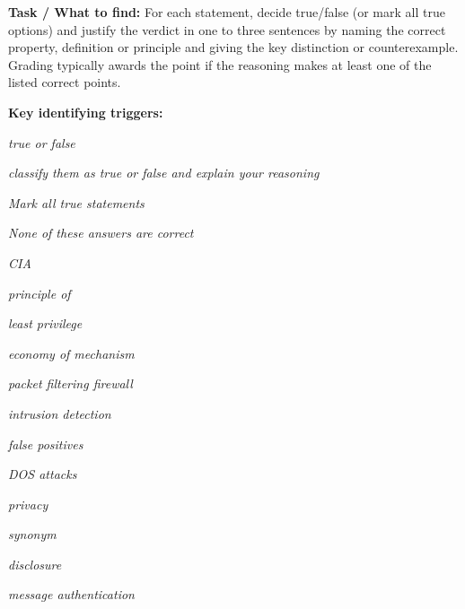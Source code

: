 \documentclass[12pt, a4paper]{article}
\begin{document}
\textbf{Task / What to find:}
For each statement, decide true/false (or mark all true options) and justify the verdict in one to three sentences by naming the correct property, definition or principle and giving the key distinction or counterexample.
Grading typically awards the point if the reasoning makes at least one of the listed correct points.

\textbf{Key identifying triggers:}
\begin{tightitem}
        \item \textit{true or false}
        \item \textit{classify them as true or false and explain your reasoning}
        \item \textit{Mark all true statements}
        \item \textit{None of these answers are correct}
        \item \textit{CIA}
        \item \textit{principle of}
        \item \textit{least privilege}
        \item \textit{economy of mechanism}
        \item \textit{packet filtering firewall}
        \item \textit{intrusion detection}
        \item \textit{false positives}
        \item \textit{DOS attacks}
        \item \textit{privacy}
        \item \textit{synonym}
        \item \textit{disclosure}
        \item \textit{message authentication}
    \end{tightitem}
\end{document}
